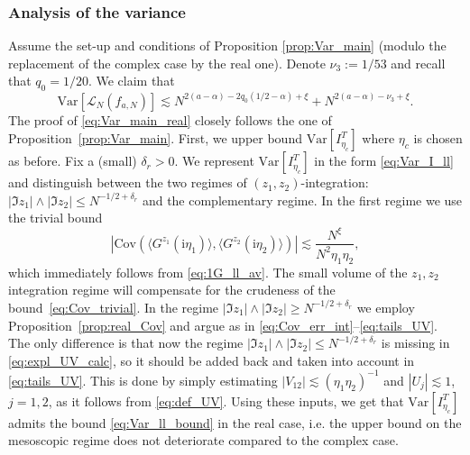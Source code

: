 \documentclass[10pt]{amsart}
\numberwithin{equation}{section}
\newcommand{\Var}{\mathrm{Var}}
\newcommand{\Lin}{\mathcal{L}}
\newcommand{\ii}{\mathrm{i}}
\begin{document}
\subsubsection{Analysis of the variance} Assume the set-up and conditions of Proposition \ref{prop:Var_main} (modulo the replacement of the complex case by the real one). Denote $\nu_3:=1/53$ and recall that $q_0=1/20$. We claim that
\begin{equation}
\Var\left[ \Lin_N(f_{a,N})\right]\lesssim N^{2(a-\alpha) - 2q_0(1/2-\alpha)+\xi} +  N^{2(a-\alpha)-\nu_3+\xi}.
\label{eq:Var_main_real}
\end{equation}
The proof of \eqref{eq:Var_main_real} closely follows the one of Proposition~\ref{prop:Var_main}. First, we upper bound $\Var[I_{\eta_c}^T]$ where $\eta_c$ is chosen as before. Fix a (small) $\delta_r>0$. We represent $\Var[I_{\eta_c}^T]$ in the form \eqref{eq:Var_I_ll} and distinguish between the two regimes of $(z_1,z_2)$-integration:  $|\Im z_1|\wedge |\Im z_2|\le N^{-1/2+\delta_r}$ and the complementary regime. In the first regime we use the trivial bound
\begin{equation}
\left\vert\mathrm{Cov}\left(\langle G^{z_1}(\ii\eta_1)\rangle,\langle G^{z_2}(\ii\eta_2)\rangle\right)\right\vert \lesssim \frac{N^\xi}{N^2\eta_1\eta_2},
\label{eq:Cov_trivial}
\end{equation}
which immediately follows from \eqref{eq:1G_ll_av}. The small volume of the $z_1,z_2$ integration regime will compensate
for the crudeness of the bound~\eqref{eq:Cov_trivial}. In the regime $|\Im z_1|\wedge |\Im z_2|\ge N^{-1/2+\delta_r}$ we employ Proposition~\ref{prop:real_Cov} and argue as in \eqref{eq:Cov_err_int}--\eqref{eq:tails_UV}. The only difference is that now the regime $|\Im z_1|\wedge |\Im z_2|\le N^{-1/2+\delta_r}$ is missing in \eqref{eq:expl_UV_calc}, so it should be added back and taken into account in \eqref{eq:tails_UV}. This is done by simply estimating $|V_{12}|\lesssim (\eta_1\eta_2)^{-1}$ and $|U_j|\lesssim 1$, $j=1,2$, as it follows from \eqref{eq:def_UV}. Using these inputs, we get that $\Var[I_{\eta_c}^T]$ admits the bound \eqref{eq:Var_ll_bound} in the real case, i.e. the upper bound on the mesoscopic regime does not deteriorate compared to the complex case.
\end{document}
